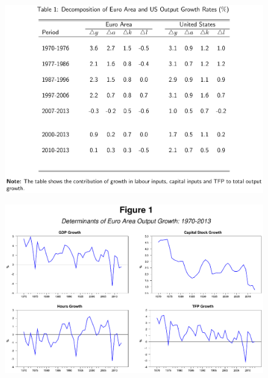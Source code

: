 \documentclass{beamer}
\begin{document}
\begin{frame}
  \begin{figure}
    \includegraphics[scale=.7]{growth_accounting1.eps}
  \end{figure}
\end{frame}

\begin{frame}
  \begin{figure}
    \includegraphics[scale=.7]{growth_accounting2.eps}
  \end{figure}
\end{frame}
\end{document}
